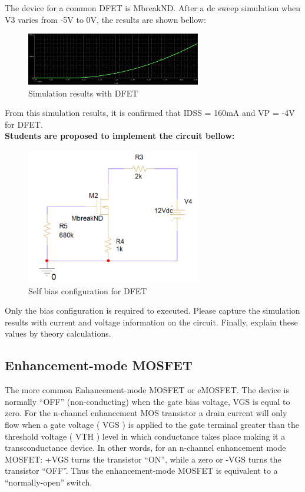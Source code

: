 The device for a common DFET is MbreakND. After a dc sweep simulation when V3 varies from -5V to 0V, the results are shown bellow:

\begin{figure}[!htp]
    \centering
    \includegraphics[width = 3in]{source/picture/bai_6/dfet2.PNG}
    \caption{Simulation results with DFET}
    \label{dfet_2}
\end{figure}

From this simulation results, it is confirmed that IDSS = 160mA and VP = -4V for DFET.\\

\textbf{Students are proposed to implement the circuit bellow:}

\begin{figure}[!htp]
    \centering
    \includegraphics[width = 3in]{source/picture/bai_6/dfet3.PNG}
    \caption{Self bias configuration for DFET}
    \label{dfet_3}
\end{figure}

Only the bias configuration is required to executed. Please capture the simulation results with current and voltage information on the circuit. Finally, explain these values by theory calculations.


\subsection{Enhancement-mode MOSFET}
The more common Enhancement-mode MOSFET or eMOSFET. The device is normally “OFF” (non-conducting) when the gate bias voltage, VGS is equal to zero. For the n-channel enhancement MOS transistor a drain current will only flow when a gate voltage ( VGS ) is applied to the gate terminal greater than the threshold voltage ( VTH ) level in which conductance takes place making it a transconductance device. In other words, for an n-channel enhancement mode MOSFET: +VGS turns the transistor “ON”, while a zero or -VGS turns the transistor “OFF”. Thus the enhancement-mode MOSFET is equivalent to a “normally-open” switch.\\

